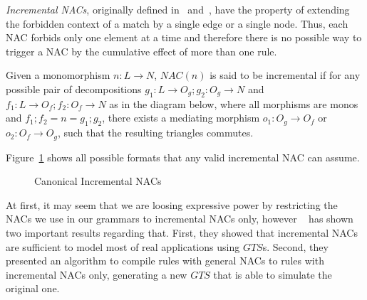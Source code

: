 \emph{Incremental NACs}, originally defined in~\cite{Corradini2013} and~\cite{Corradini2014}, have the property of extending the forbidden context of a match by a single edge or a single node. Thus, each NAC forbids only one element at a time and therefore there is no possible way to trigger a NAC by the cumulative effect of more than one rule.

\begin{definition} Given a monomorphism \mbox{$n : L \rightarrow N$}, $NAC(n)$ is said to be incremental if for any possible pair of decompositions \mbox{$g_1 : L \rightarrow O_g;g_2 : O_g \rightarrow N$} and \mbox{$f_1 : L \rightarrow O_f;f_2 : O_f \rightarrow N$} as in the diagram below, where all morphisms are monos and \mbox{$f_1;f_2 = n = g_1;g_2$}, there exists a mediating morphism $o_1 : O_g \rightarrow O_f$ or $o_2 : O_f \rightarrow O_g$, such that the resulting triangles
  commutes.


\end{definition}

\begin{example}Figure~\ref{fig:process:incremental-nacs} shows all possible formats that any valid incremental NAC can assume.

\begin{figure}[!ht]
  \centering
  \caption{Canonical Incremental NACs}\label{fig:process:incremental-nacs}
\end{figure}
\end{example}

At first, it may seem that we are loosing expressive power by restricting the NACs we use in our grammars to incremental NACs only, however ~\cite{Corradini2013} has shown two important results regarding that. First, they showed that incremental NACs are sufficient to model most of real applications using $GTS$s. Second, they presented an algorithm to compile rules with general NACs to rules with incremental NACs only, generating a new $GTS$ that is able to simulate the original one.


